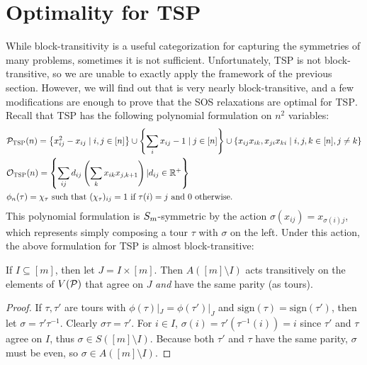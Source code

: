 \section{Optimality for \textsc{TSP}}
While block-transitivity is a useful categorization for capturing the symmetries of many problems, sometimes it is not sufficient. Unfortunately, \textsc{TSP} is not block-transitive, so we are unable to exactly apply the framework of the previous section. However, we will find out that is very nearly block-transitive, and a few modifications are enough to prove that the SOS relaxations are optimal for \textsc{TSP}. 
Recall that \textsc{TSP} has the following polynomial formulation on $n^2$ variables:
\begin{align*}
&\mathcal P_{\textsc{TSP}}(n) = \left\{x_{ij}^2 - x_{ij} \mid i,j \in [n]\right\} \cup \left\{\sum_i x_{ij} - 1 \mid j \in [n]\right\} \cup \left\{x_{ij}x_{ik}, x_{ji}x_{ki} \mid i,j,k \in [n], j \neq k\right\} \\
&\mathcal O_{\textsc{TSP}}(n) = \left\{\sum_{ij} d_{ij}\left(\sum_{k} x_{ik}x_{j,k+1}\right) | d_{ij} \in \mathbb R^+\right\} \\
&\phi_n(\tau) = \chi_{\tau} \text{ such that $(\chi_\tau)_{ij} = 1$ if $\tau(i) = j$ and $0$ otherwise.}
\end{align*}
This polynomial formulation is $S_{m}$-symmetric by the action $\sigma(x_{ij}) = x_{\sigma(i)j}$, which represents simply composing a tour $\tau$ with $\sigma$ on the left. Under this action, the above formulation for \textsc{TSP} is almost block-transitive:
\begin{lemma}\label{lem:tsp-blocktransitive}
If $I \subseteq [m]$, then let $J = I \times [m]$. Then $A([m] \setminus I)$ acts transitively on the elements of $V(\mathcal P)$ that agree on $J$ \emph{and} have the same parity (as tours).
\end{lemma}
\begin{proof}
If $\tau,\tau'$ are tours with $\phi(\tau)|_J = \phi(\tau')|_J$ and $\text{sign}(\tau) = \text{sign}(\tau')$, then let $\sigma = \tau'\tau^{-1}$. Clearly $\sigma\tau = \tau'$. For $i \in I$, $\sigma(i) = \tau'(\tau^{-1}(i)) = i$ since $\tau'$ and $\tau$ agree on $I$, thus $\sigma \in S([m]\setminus I)$. Because both $\tau'$ and $\tau$ have the same parity, $\sigma$ must be even, so $\sigma \in A([m]\setminus I)$.
\end{proof}

